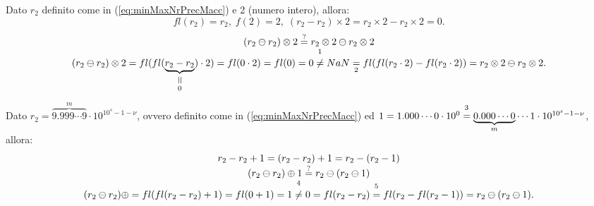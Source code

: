 \begin{example}
    Dato $r_2$ definito come in (\ref{eq:minMaxNrPrecMacc}) e 2 (numero intero), allora:
    \begin{equation*}
        fl(r_2)=r_2,\; f(2)=2,\; (r_2-r_2)\times 2= r_2\times 2- r_2\times 2=0. 
    \end{equation*}
    \begin{equation*}
        \begin{matrix}
            (r_2\ominus r_2)\otimes 2 \overset{?}{=}r_2\otimes 2\ominus r_2\otimes 2\\
            (r_2\ominus r_2)\otimes 2 = fl(fl(\equalto{\underbrace{r_2-r_2}}{0})\cdot2)=fl(0\cdot 2)=fl(0)=0\overset{\footnotemark}{\neq} NaN \underset{\footnotemark}{=}fl(fl(r_2\cdot 2)-fl({r_2\cdot 2}))= r_2\otimes 2\ominus r_2\otimes 2.
        \end{matrix}
    \end{equation*}

    \addtocounter{footnote}{-1}

    
\end{example}
\begin{example}
    Dato $r_2=\overbrace{9.999\cdots 9}^{m}\cdot 10^{10^s-1-\nu}$, ovvero definito come in (\ref{eq:minMaxNrPrecMacc}) ed $1=1.000\cdots 0\cdot 10^0\overset{\footnotemark}{=}\underbrace{0.000\cdots 0}_{m}\cdots 1\cdot 10^{10^s-1-\nu}$,  allora:
    \begin{equation*}
        \begin{matrix}
            r_2-r_2+1=(r_2-r_2)+1=r_2-(r_2-1)\\
            (r_2\ominus r_2)\oplus 1 \overset{?}{=} r_2\ominus(r_2\ominus1)\\
            (r_2\ominus r_2)\oplus=fl(fl(r_2-r_2)+1)=fl(0+1)=1\overset{\footnotemark}{\neq} 0=fl(r_2-r_2)\overset{\footnotemark}{=}fl(r_2-fl(r_2-1))=r_2\ominus(r_2\ominus 1).
        \end{matrix}
    \end{equation*}
    \addtocounter{footnote}{-1}

\end{example}

